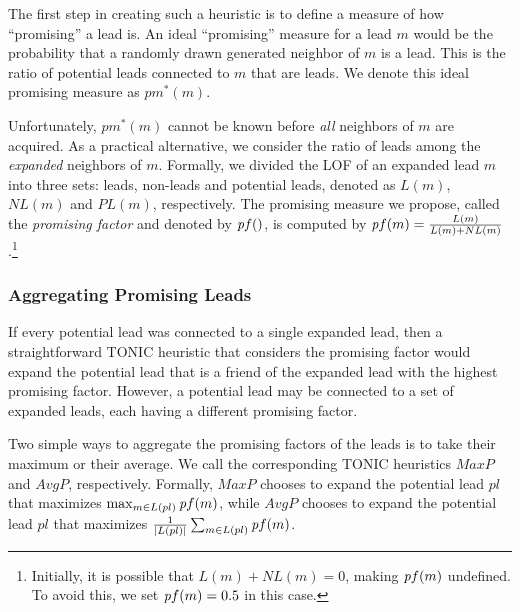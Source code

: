 \documentclass[prodmode,acmtecs]{acmsmall} %
\newcommand{\pf}{{\textit pf}}
\begin{document}
The first step in creating such a heuristic is to define a measure of how ``promising'' a lead is. An ideal ``promising'' measure for a lead $m$ would be the probability that a randomly drawn generated neighbor of $m$ is a lead. This is the ratio of potential leads connected to $m$ that are leads. We denote this ideal promising measure as $pm^*(m)$.

Unfortunately, $pm^*(m)$ cannot be known before {\em all} neighbors of $m$ are acquired. As a practical alternative, we consider the ratio of leads among the {\em expanded} neighbors of $m$. Formally, we divided the LOF of an expanded lead $m$ into three sets: leads, non-leads and potential leads, denoted as $L(m)$, $NL(m)$ and $PL(m)$, respectively. The promising measure we propose, called the {\em promising factor} and denoted by $\pf()$, is computed by $\pf(m)=\frac{L(m)}{L(m)+NL(m)}$.\footnote{Initially, it is possible that $L(m)+NL(m)=0$, making $\pf(m)$ undefined. To avoid this, we set $\pf(m)=0.5$ in this case.}


\subsubsection{Aggregating Promising Leads}

If every potential lead was connected to a single expanded lead, then a straightforward TONIC heuristic that considers the promising factor would expand the potential lead that is a friend of the expanded lead with the highest promising factor. However, a potential lead may be connected to a set of expanded leads, each having a different promising factor.

Two simple ways to aggregate the promising factors of the leads is to take their maximum or their average. We call the corresponding TONIC heuristics $MaxP$ and $AvgP$, respectively. Formally, $MaxP$ chooses to expand the potential lead $pl$ that maximizes $\max_{m\in L(pl)}{\pf(m)}$, while $AvgP$ chooses to expand the potential lead $pl$ that maximizes $\frac{1}{|L(pl)|}\sum_{m\in L(pl)} \pf(m)$. 
\end{document}
